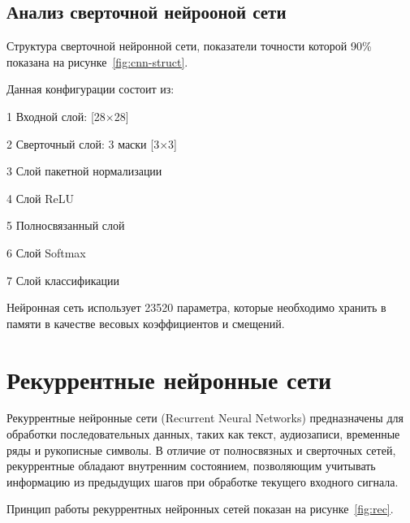 \subsection{Анализ сверточной нейрооной сети}
\hspace*{12.5 mm}Структура сверточной нейронной сети, показатели точности 
которой 90\% показана на рисунке~\ref{fig:cnn-struct}\cite{CNN}.


Данная конфигурации состоит из: 

  1 Входной слой: [28$\times$28]

  2 Сверточный слой: 3 маски [3$\times$3] 

  3 Слой пакетной нормализации 

  4 Слой ReLU 

  5 Полносвязанный слой 

  6 Слой Softmax 

  7 Слой классификации

Нейронная сеть использует 23520 параметра, которые необходимо хранить в памяти 
в качестве весовых коэффициентов и смещений.

\section{Рекуррентные нейронные сети}
\hspace*{12.5 mm}Рекуррентные нейронные сети (Recurrent Neural Networks) 
предназначены для обработки последовательных данных, таких как текст, 
аудиозаписи, временные ряды и рукописные символы. В отличие от полносвязных и 
сверточных сетей, рекуррентные обладают внутренним состоянием, позволяющим 
учитывать информацию из предыдущих шагов при обработке текущего входного 
сигнала.

Принцип работы рекуррентных нейронных сетей показан на рисунке~\ref{fig:rec}.


